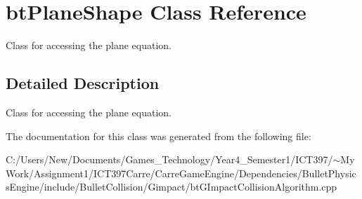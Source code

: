 \hypertarget{classbt_plane_shape}{
\section{btPlaneShape Class Reference}
\label{classbt_plane_shape}
}
Class for accessing the plane equation.  




\subsection{Detailed Description}
Class for accessing the plane equation. 

The documentation for this class was generated from the following file:\begin{CompactItemize}
\item 
C:/Users/New/Documents/Games\_\-Technology/Year4\_\-Semester1/ICT397/$\sim$My Work/Assignment1/ICT397Carre/CarreGameEngine/Dependencies/BulletPhysicsEngine/include/BulletCollision/Gimpact/btGImpactCollisionAlgorithm.cpp\end{CompactItemize}
